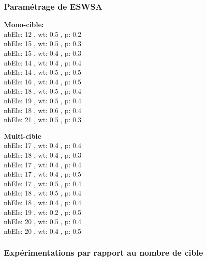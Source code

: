 \subsubsection{Paramétrage de ESWSA}
\noindent
\begin{minipage}[t]{0.55\textwidth}
	\textbf{Mono-cible:} \\
	nbEle: 12 , wt: 0.5 , p: 0.2\\
	nbEle: 15 , wt: 0.5 , p: 0.3\\
	nbEle: 15 , wt: 0.4 , p: 0.3\\
	nbEle: 14 , wt: 0.4 , p: 0.4\\
	nbEle: 14 , wt: 0.5 , p: 0.5\\
	nbEle: 16 , wt: 0.4 , p: 0.5\\
	nbEle: 18 , wt: 0.5 , p: 0.4\\
	nbEle: 19 , wt: 0.5 , p: 0.4\\
	nbEle: 18 , wt: 0.6 , p: 0.4\\
	nbEle: 21 , wt: 0.5 , p: 0.3\\
	
	
\end{minipage}\hfill
\hspace{0.2cm}
\begin{minipage}[t]{0.55\textwidth}
	\textbf{Multi-cible}\\
	nbEle: 17 , wt: 0.4 , p: 0.4\\
	nbEle: 18 , wt: 0.4 , p: 0.3\\
	nbEle: 17 , wt: 0.4 , p: 0.4\\
	nbEle: 17 , wt: 0.4 , p: 0.5\\
	nbEle: 17 , wt: 0.5 , p: 0.4\\
	nbEle: 18 , wt: 0.5 , p: 0.4\\
	nbEle: 18 , wt: 0.4 , p: 0.4\\
	nbEle: 19 , wt: 0.2 , p: 0.5\\
	nbEle: 20 , wt: 0.5 , p: 0.4\\
	nbEle: 20 , wt: 0.4 , p: 0.5\\
	
	
	
	
\end{minipage}\hfill


\subsubsection{Expérimentations par rapport au nombre de cible}

